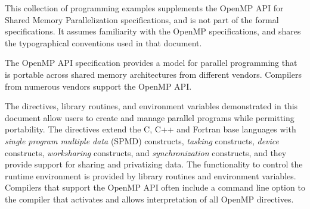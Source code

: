 %
%
%
%
%
%
%
%
%
%

\label{chap:introduction}

This collection of programming examples supplements the OpenMP API for Shared
Memory Parallelization specifications, and is not part of the formal specifications. It
assumes familiarity with the OpenMP specifications, and shares the typographical
conventions used in that document.

The OpenMP API specification provides a model for parallel programming that is
portable across shared memory architectures from different vendors. Compilers from
numerous vendors support the OpenMP API.

The directives, library routines, and environment variables demonstrated in this
document allow users to create and manage parallel programs while permitting
portability. The directives extend the C, C++ and Fortran base languages with \emph{single
program multiple data} (SPMD) constructs, \emph{tasking} constructs, \emph{device} constructs,
\emph{worksharing} constructs, and \emph{synchronization} constructs, and they provide support for
sharing and privatizing data. The functionality to control the runtime environment is
provided by library routines and environment variables. Compilers that support the
OpenMP API often include a command line option to the compiler that activates and
allows interpretation of all OpenMP directives.


